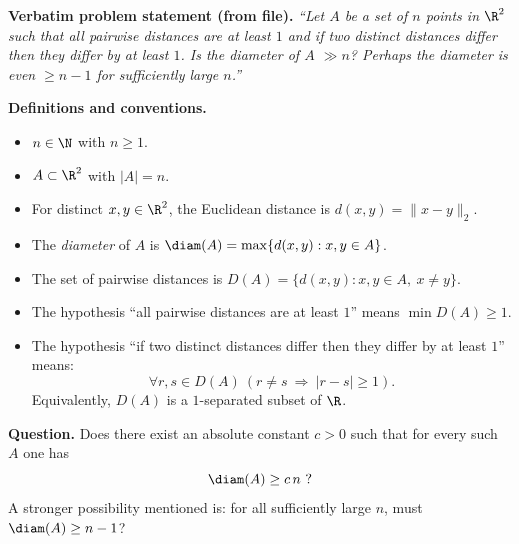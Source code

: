 \noindent\textbf{Verbatim problem statement (from file).}
\emph{``Let $A$ be a set of $n$ points in $\R^2$ such that all pairwise distances are at least $1$ and if two distinct distances differ then they differ by at least $1$. Is the diameter of $A$ $\gg n$? Perhaps the diameter is even $\ge n-1$ for sufficiently large $n$.''}

\medskip
\noindent\textbf{Definitions and conventions.}
\begin{itemize}[leftmargin=2em]
\item $n\in\N$ with $n\ge 1$.
\item $A\subset\R^2$ with $|A|=n$.
\item For distinct $x,y\in\R^2$, the Euclidean distance is $d(x,y)=\|x-y\|_2$.
\item The \emph{diameter} of $A$ is $\diam(A)=\max\{d(x,y):x,y\in A\}$.
\item The set of pairwise distances is $D(A)=\{d(x,y):x,y\in A,\ x\ne y\}$.
\item The hypothesis ``all pairwise distances are at least $1$'' means $\min D(A)\ge 1$.
\item The hypothesis ``if two distinct distances differ then they differ by at least $1$'' means:
\[\forall r,s\in D(A)\ (r\ne s\ \Rightarrow\ |r-s|\ge 1).\]
Equivalently, $D(A)$ is a $1$-separated subset of $\R$.
\end{itemize}

\medskip
\noindent\textbf{Question.}
Does there exist an absolute constant $c>0$ such that for every such $A$ one has
\[\diam(A)\ge c\,n\ ?\]
A stronger possibility mentioned is: for all sufficiently large $n$, must $\diam(A)\ge n-1$?
